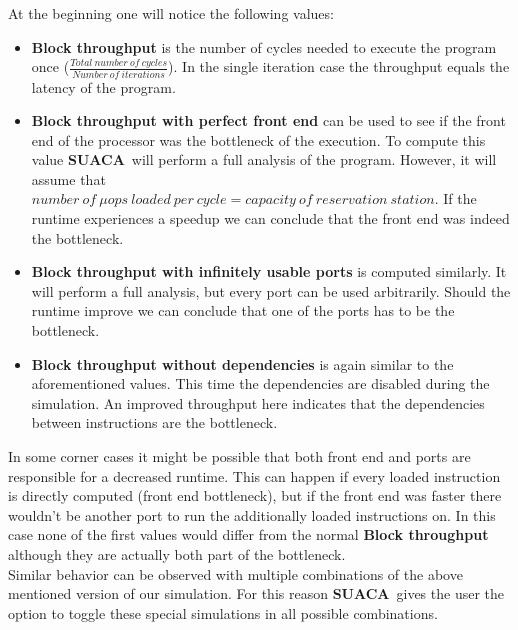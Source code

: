 \documentclass[a4paper,12pt,titlepage, twoside]{report}
\newcommand{\suaca}{\textbf{SUACA}}
\begin{document}
At the beginning one will notice the following values:
\begin{itemize}
    \item \textbf{Block throughput} is the number of cycles needed to execute the program once ($\frac{Total\ number\ of\ cycles}{Number\ of\ iterations}$). In the single iteration case the throughput equals the latency of the program.
    \item \textbf{Block throughput with perfect front end} can be used to see if the front end of the processor was the bottleneck of the execution. To compute this value \suaca\ will perform a full analysis of the program. However, it will assume that $number\ of\ \mu ops\ loaded\ per\ cycle = capacity\ of\ reservation\ station$. If the runtime experiences a speedup we can conclude that the front end was indeed the bottleneck.
    \item \textbf{Block throughput with infinitely usable ports} is computed similarly. It will perform a full analysis, but every port can be used arbitrarily. Should the runtime improve we can conclude that one of the ports has to be the bottleneck.
    \item \textbf{Block throughput without dependencies} is again similar to the aforementioned values. This time the dependencies are disabled during the simulation. An improved throughput here indicates that the dependencies between instructions are the bottleneck. 
\end{itemize}

In some corner cases it might be possible that both front end and ports are responsible for a decreased runtime. This can happen if every loaded instruction is directly computed (front end bottleneck), but if the front end was faster there wouldn't be another port to run the additionally loaded instructions on. In this case none of the first values would differ from the normal \textbf{Block throughput} although they are actually both part of the bottleneck.\\
Similar behavior can be observed with multiple combinations of the above mentioned version of our simulation. For this reason \suaca\ gives the user the option to toggle these special simulations in all possible combinations.\\
\end{document}
